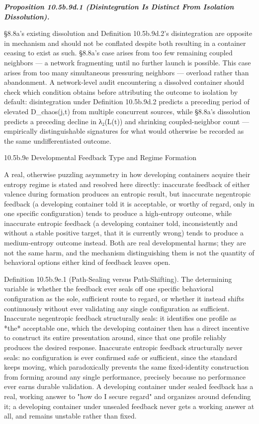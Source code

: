 \documentclass[
]{article}
\begin{document}
\emph{\textbf{Proposition 10.5b.9d.1 (Disintegration Is Distinct From
Isolation Dissolution).}}

§8.8a's existing dissolution and Definition 10.5b.9d.2's disintegration
are opposite in mechanism and should not be conflated despite both
resulting in a container ceasing to exist as such. §8.8a's case arises
from too few remaining coupled neighbors --- a network fragmenting until
no further launch is possible. This case arises from too many
simultaneous pressuring neighbors --- overload rather than abandonment.
A network-level audit encountering a dissolved container should check
which condition obtains before attributing the outcome to isolation by
default: disintegration under Definition 10.5b.9d.2 predicts a preceding
period of elevated D\_chaos(j,t) from multiple concurrent sources, while
§8.8a's dissolution predicts a preceding decline in λ₂(L(t)) and
shrinking coupled-neighbor count --- empirically distinguishable
signatures for what would otherwise be recorded as the same
undifferentiated outcome.

10.5b.9e Developmental Feedback Type and Regime Formation

A real, otherwise puzzling asymmetry in how developing containers
acquire their entropy regime is stated and resolved here directly:
inaccurate feedback of either valence during formation produces an
entropic result, but inaccurate negentropic feedback (a developing
container told it is acceptable, or worthy of regard, only in one
specific configuration) tends to produce a high-entropy outcome, while
inaccurate entropic feedback (a developing container told,
inconsistently and without a stable positive target, that it is
currently wrong) tends to produce a medium-entropy outcome instead. Both
are real developmental harms; they are not the same harm, and the
mechanism distinguishing them is not the quantity of behavioral options
either kind of feedback leaves open.

Definition 10.5b.9e.1 (Path-Sealing versus Path-Shifting). The
determining variable is whether the feedback ever seals off one specific
behavioral configuration as the sole, sufficient route to regard, or
whether it instead shifts continuously without ever validating any
single configuration as sufficient. Inaccurate negentropic feedback
structurally seals: it identifies one profile as *the* acceptable one,
which the developing container then has a direct incentive to construct
its entire presentation around, since that one profile reliably produces
the desired response. Inaccurate entropic feedback structurally never
seals: no configuration is ever confirmed safe or sufficient, since the
standard keeps moving, which paradoxically prevents the same
fixed-identity construction from forming around any single performance,
precisely because no performance ever earns durable validation. A
developing container under sealed feedback has a real, working answer to
"how do I secure regard" and organizes around defending it; a developing
container under unsealed feedback never gets a working answer at all,
and remains unstable rather than fixed.
\end{document}
